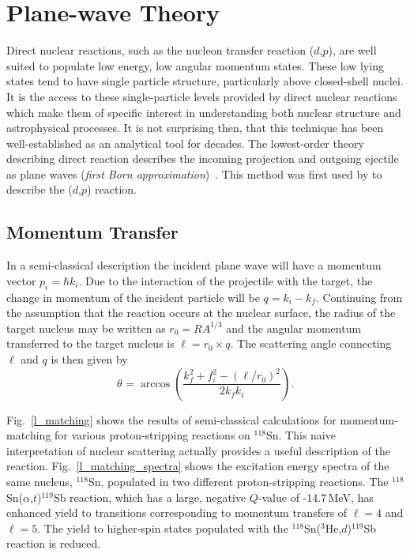 \section{Plane-wave Theory}
Direct nuclear reactions, such as the nucleon transfer reaction ($d$,$p$),  are well suited to populate low energy, low angular momentum states. These low lying states tend to have single particle structure, particularly above closed-shell nuclei.  It is the access to these single-particle levels provided by direct nuclear reactions which make them of specific interest in understanding both nuclear structure and astrophysical processes.  It is not surprising then, that this technique has been well-established as an analytical tool for decades.  The lowest-order theory describing direct reaction describes the incoming projection and outgoing ejectile as plane waves (\textit{first Born approximation})~\cite{Glendenning_2004}.  This method was first used by \citet{Butler_1950} to describe the ($d$,$p$) reaction.%

\subsection{Momentum Transfer}
In a semi-classical description the incident plane wave will have a momentum vector $p_i=\hbar k_i$.  Due to the interaction of the projectile with the target, the change in momentum of the incident particle will be $q=k_i-k_f$.  Continuing from the assumption that the reaction occurs at the nuclear surface, the radius of the target nucleus may be written as $r_0=R A^{1/3}$ and the angular momentum transferred to the target nucleus is $\ell=r_0 \times q$. The scattering angle connecting $\ell$ and $q$ is then given by
\begin{equation}
\theta_\mathrm{}=\arccos\left(\frac{k_f^2+f_i^2-(\ell/r_0)^2}{2k_fk_i}\right).
\label{eq:theta_max}
\end{equation}

Fig.~\ref{l_matching} shows the results of semi-classical calculations for momentum-matching for various pro\-ton-\-strip\-ping reactions on $^{118}$Sn.  This naive interpretation of nuclear scattering actually provides a useful description of the reaction.  Fig.~\ref{l_matching_spectra} shows the excitation energy spectra of the same nucleus, $^{118}$Sn, populated in two different proton-stripping reactions.  The $^{118}$Sn($\alpha$,$t$)$^{119}$Sb reaction, which has a large, negative $Q$-value of -14.7\,MeV, has enhanced yield to transitions corresponding to momentum transfers of $\ell=4$ and $\ell=5$. The yield to higher-spin states populated with the $^{118}$Sn($^3$He,$d$)$^{119}$Sb reaction is reduced. 

